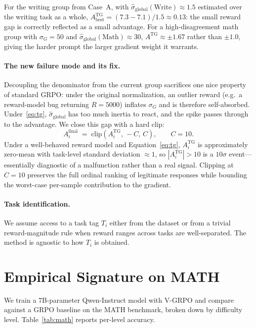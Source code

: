 \documentclass[10pt]{article}
\begin{document}
For the writing group from Case~A, with $\hat{\sigma}_{\text{global}}(\text{Write})
\approx 1.5$ estimated over the writing task as a whole,
$A^{\text{TG}}_{\text{best}} = (7.3 - 7.1)/1.5 \approx 0.13$: the small reward gap
is correctly reflected as a small advantage. For a high-disagreement math group
with $\sigma_G = 50$ and $\hat{\sigma}_{\text{global}}(\text{Math}) \approx 30$,
$A^{\text{TG}} \approx \pm 1.67$ rather than $\pm 1.0$, giving the harder
prompt the larger gradient weight it warrants.

\paragraph{The new failure mode and its fix.}
Decoupling the denominator from the current group sacrifices one nice property of
standard GRPO: under the original normalization, an outlier reward (e.g.\ a
reward-model bug returning $R=5000$) inflates $\sigma_G$ and is therefore
self-absorbed. Under~\eqref{eq:tg}, $\hat{\sigma}_{\text{global}}$ has too much
inertia to react, and the spike passes through to the advantage. We close this
gap with a hard clip:
\begin{equation}
A_i^{\text{final}} \;=\; \mathrm{clip}\!\left(A_i^{\text{TG}},\,-C,\,C\right),
\qquad C = 10.
\label{eq:clip}
\end{equation}
Under a well-behaved reward model and Equation~\eqref{eq:tg},
$A^{\text{TG}}_i$ is approximately zero-mean with task-level standard deviation
$\approx 1$, so $|A^{\text{TG}}_i| > 10$ is a $10\sigma$ event---essentially
diagnostic of a malfunction rather than a real signal. Clipping at $C=10$
preserves the full ordinal ranking of legitimate responses while bounding the
worst-case per-sample contribution to the gradient.

\paragraph{Task identification.}
We assume access to a task tag $T_i$ either from the dataset or from a trivial
reward-magnitude rule when reward ranges across tasks are well-separated. The
method is agnostic to how $T_i$ is obtained.

\section{Empirical Signature on MATH}

We train a 7B-parameter Qwen-Instruct model with V-GRPO and compare against a
GRPO baseline on the MATH benchmark, broken down by difficulty level.
Table~\ref{tab:math} reports per-level accuracy.
\end{document}
